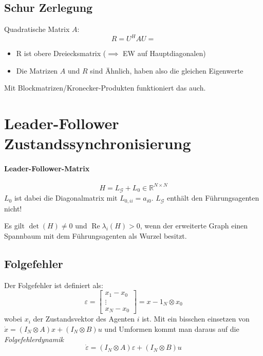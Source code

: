 \subsection{Schur Zerlegung}
Quadratische Matrix $A$:
\begin{equation}
    R=U^H A U = 
\end{equation}
\begin{itemize}
    \item R ist obere Dreiecksmatrix ($\implies$ EW auf Hauptdiagonalen)
    \item Die Matrizen $A$ und $R$ sind Ähnlich, haben also die gleichen Eigenwerte
\end{itemize}

Mit Blockmatrizen/Kronecker-Produkten funktioniert das auch.

\section{Leader-Follower Zustandssynchronisierung}
\paragraph{Leader-Follower-Matrix}
\label{par:leader_follower_matrix}
\begin{equation}
    \tag{Leader-Follower-Matrix}
    H = L_\mathcal{G} + L_0 \in \mathbb{R}^{N\times N}
    \label{eqn:lf_matrix}
\end{equation}
$L_0$ ist dabei die Diagonalmatrix mit $L_{0,ii}=a_{i0}$.
$L_\mathcal{G}$ enthält den Führungsagenten nicht!

Es gilt $\det(H) \neq 0$ und $\operatorname{Re}\lambda_i(H) > 0$,
wenn der erweiterte Graph einen Spannbaum mit dem Führungsagenten als
Wurzel besitzt.

\subsection{Folgefehler}
Der Folgefehler ist definiert als:
\begin{equation}
    \varepsilon = \begin{bmatrix}
        x_1-x_0 \\
        \vdots \\
        x_N-x_0
    \end{bmatrix}
    = x-1_N \otimes x_0
\end{equation}
wobei $x_i$ der Zustandsvektor des Agenten $i$ ist.
Mit ein bisschen einsetzen von $\dot{x} = (I_N \otimes A)x + (I_N \otimes B)u$
und Umformen kommt man daraus auf die \emph{Folgefehlerdynamik}
\begin{equation}
    \dot{\varepsilon} = (I_N \otimes A)\varepsilon + (I_N \otimes B)u
\end{equation}

